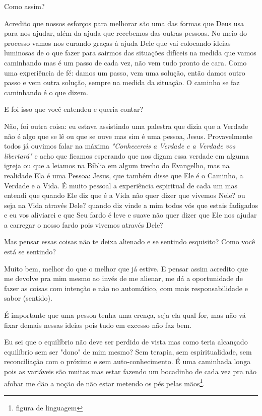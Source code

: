 \emdash{}Como assim?

\emdash{}Acredito que nossos esforços para melhorar são uma das formas que Deus usa para nos ajudar, além da ajuda que recebemos das outras pessoas. No meio do processo vamos nos curando graças à ajuda Dele que vai colocando ideias luminosas de o que fazer para sairmos das situações difíceis na medida que vamos caminhando mas é um passo de cada vez, não vem tudo pronto de cara. Como uma experiência de fé: damos um passo, vem uma solução, então damos outro passo e vem outra solução, sempre na medida da situação. O caminho se faz caminhando é o que dizem.

\emdash{}E foi isso que você entendeu e queria contar?

\emdash{}Não, foi outra coisa: eu estava assistindo uma palestra que dizia que a Verdade não é algo que se lê ou que se ouve mas sim é uma pessoa, Jesus. Provavelmente todos já ouvimos falar na máxima \textit{"Conhecereis a Verdade e a Verdade vos libertará"} e acho que ficamos esperando que nos digam essa verdade em alguma igreja ou que a leiamos na Bíblia em algum trecho do Evangelho, mas na realidade Ela é uma Pessoa: Jesus, que também disse que Ele é o Caminho, a Verdade e a Vida. É muito pessoal a experiência espiritual de cada um mas entendi que quando Ele diz que é a Vida não quer dizer que vivemos Nele? ou seja na Vida através Dele? quando diz vinde a mim todos vós que estais fadigados e eu vos aliviarei e que Seu fardo é leve e suave não quer dizer que Ele nos ajudar a carregar o nosso fardo pois vivemos através Dele?

\emdash{}Mas pensar essas coisas não te deixa alienado e se sentindo esquisito? Como você está se sentindo?

\emdash{}Muito bem, melhor do que o melhor que já estive. E pensar assim acredito que me devolve pra mim mesmo ao invés de me alienar, me dá a oportunidade de fazer as coisas com intenção e não no automático, com mais responsabilidade e sabor (sentido).

\emdash{}É importante que uma pessoa tenha uma crença, seja ela qual for, mas não vá fixar demais nessas ideias pois tudo em excesso não faz bem.

\emdash{}Eu sei que o equilíbrio não deve ser perdido de vista mas como teria alcançado equilíbrio sem ser "dono" de mim mesmo? Sem terapia, sem espiritualidade, sem reconciliação com o próximo e sem auto-conhecimento. É uma caminhada longa pois as variáveis são muitas mas estar fazendo um bocadinho de cada vez pra não afobar me dão a noção de não estar metendo os pés pelas mãos\footnote{figura de linguagem}. 


